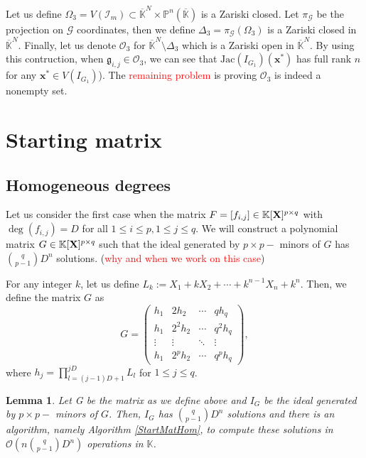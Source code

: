 \documentclass[11pt]{article}
\numberwithin{Property}{section}
\numberwithin{Theorem}{section}
\numberwithin{Proposition}{section}
\newtheorem{Lemma}{Lemma}%
\numberwithin{Lemma}{section}
\numberwithin{Corollary}{section}
\numberwithin{Definition}{section}
\numberwithin{Remark}{section}
\numberwithin{Conjecture}{section}
\numberwithin{Problem}{section}
\numberwithin{Example}{section}
\numberwithin{Claim}{section}
\renewcommand{\leq}{\leqslant}
\def\bar{\overline}
\newcommand{\bigO}[1]{\mathcal{O}(#1)} %
\newcommand{\var}{X} %
\newcommand{\field}{\mathbb{K}} %
\newcommand{\mat}[1]{\mathbf{\MakeUppercase{#1}}} %
\newcommand{\todo}[1]{\textcolor{red}{#1}} %
\begin{document}
Let us define $\Omega_3 = V(\mathcal{I}_m) \subset \bar{\field}^N \times \mathbb{P}^n(\bar{\field})$ is a Zariski closed. Let $\pi_{\mathcal{G}}$ be the projection on $\mathcal{G}$ coordinates, then we define $\Delta_3 = \pi_{\mathcal{G}}(\Omega_3)$ is a Zariski closed in $\bar{\field}^N $. Finally, let us denote  $\mathcal{O}_3$ for $\bar{\field}^N \setminus \Delta_3$ which is a Zariski open in $\bar{\field}^N $. By using this contruction, when $\mathfrak{g}_{i,j} \in \mathcal{O}_3$, we can see that  $\mathrm{Jac}(I_{G_1})(\mathbf{x}^*)$ has full rank $n$ for any $\mathbf{x}^* \in V(I_{G_1})$). The \todo{remaining problem } is proving $\mathcal{O}_3$ is indeed a nonempty set. 
\section{Starting matrix}
\subsection{Homogeneous degrees}
Let us consider the first case when the matrix $F = [f_{i,j}] \in \field[\mat{X}]^{p\times q}$ with $\deg(f_{i,j}) = D$ for all $1 \leq i \leq p, 1 \leq j \leq q$. We will construct a polynomial matrix $G \in \field[\mat{X}]^{p \times q}$ such that the ideal generated by $p \times p-$ minors of $G$ has ${q \choose {p-1}}D^n$ solutions. (\todo{why and when we work on this case})

For any integer $k$, let us define $L_k := \var_1 + k\var_2 + \cdots + k^{n-1}\var_n + k^n$. Then, we define the matrix $G$ as 
\[G = 
\left( \begin{matrix}
h_1 & 2h_2 & \cdots & qh_q\\
h_1 & 2^2h_2 &\cdots & q^2h_q\\
\vdots & \vdots  & \ddots & \vdots \\
h_1 & 2^ph_2& \cdots & q^ph_q
\end{matrix} \right),
\] where $h_j = \prod_{l=(j-1)D+1}^{jD} L_{l}$ for $1 \leq j \leq q$. %
\begin{Lemma} Let G be the matrix as we define above and $I_G$ be the ideal generated by $p \times p-$ minors of $G$. Then, $I_G$ has ${q \choose {p-1}}D^n$ solutions and there is an algorithm, namely Algorithm \ref{StartMatHom}, to compute these solutions in  $\bigO{n{q \choose {p-1}}D^n}$ operations in $\field$.
 \end{Lemma}
\end{document}
